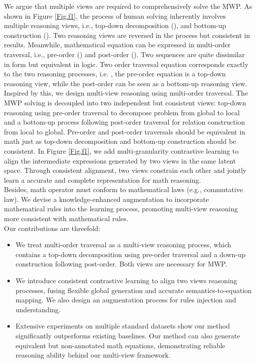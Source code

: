 \documentclass[11pt]{article}
\begin{document}
\indent We argue that multiple views are required to comprehensively
solve the MWP. As shown in Figure \ref{Fig.f1}, the process of human solving inherently involves multiple reasoning views, i.e., top-down decomposition (), and bottom-up construction (). Two reasoning views are reversed in the process but consistent in results. Meanwhile, mathematical equation can be expressed in multi-order traversal, i.e., pre-order () and post-order (). Two sequences are quite dissimilar in form but equivalent in logic. Two order traversal equation corresponds exactly to the two reasoning processes, i.e. , the pre-order equation is a top-down reasoning view, while the post-order can be seen as a bottom-up reasoning view.\\
\indent Inspired by this, we design multi-view reasoning using multi-order traversal. The MWP solving is decoupled into two independent but consistent views: top-down reasoning using pre-order traversal to decompose problem from global to local and a bottom-up process following post-order traversal for relation construction from local to global. Pre-order and post-order traversals should be equivalent in math just as top-down decomposition and bottom-up construction should be consistent. In Figure \ref{Fig.f1}, we add multi-granularity contrastive learning to align the intermediate expressions generated by two views in the same latent space. Through consistent alignment, two views constrain each other and jointly learn a accurate and complete representation for math reasoning.\\
\indent Besides, math operator must conform to mathematical laws (e.g., commutative law). We devise a knowledge-enhanced augmentation to incorporate mathematical rules into the learning process, promoting multi-view reasoning more consistent with mathematical rules.\\
\indent Our contributions are threefold:

\vspace{-\topsep}
\begin{itemize}
  \setlength{\parskip}{2pt}
  \setlength{\itemsep}{0pt plus 1pt}
\item We treat multi-order traversal as a multi-view reasoning process, which contains a top-down decomposition using pre-order traversal and a down-up construction following post-order. Both views are necessary for MWP.
\item We introduce consistent contrastive learning to align two views reasoning processes, fusing flexible global generation and accurate semantics-to-equation mapping. We also design an augmentation process for rules injection and understanding.
\item Extensive experiments on multiple standard datasets show our method signiﬁcantly outperforms existing baselines. Our method can also generate equivalent but non-annotated math equations, demonstrating reliable reasoning ability behind our multi-view framework.
\end{itemize}
\vspace{-\topsep}
\end{document}
